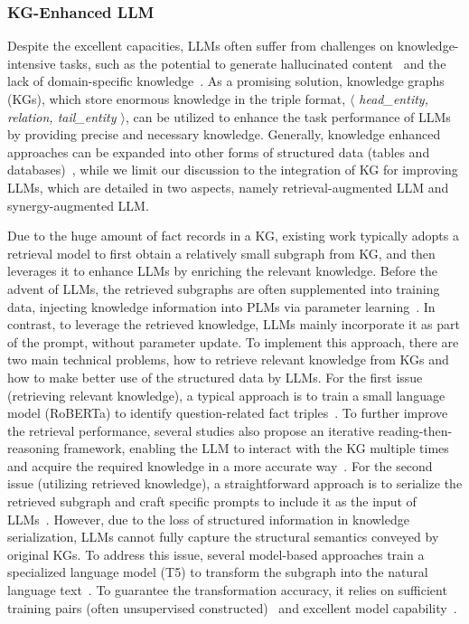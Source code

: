 {\subsubsection{KG-Enhanced LLM}
{
Despite the excellent capacities, LLMs often suffer from challenges on knowledge-intensive tasks, such as 
the potential to generate hallucinated content~\cite{Li-arxiv-2023-HaluEval} and the lack of domain-specific knowledge~\cite{Pan-arxiv-2023-Unifying}. 
As a promising solution, knowledge graphs (KGs),  which store enormous knowledge in the triple format, \ie \textit{$\langle$ head\_entity, relation, tail\_entity $\rangle$}, can be utilized to enhance the task performance of LLMs by providing precise and necessary knowledge.
Generally, knowledge enhanced approaches can be expanded into other forms of structured data (\eg tables and databases)~\cite{Ruiz-arxiv-2023-SemTab}, while we limit our discussion to the integration of KG for improving LLMs, which are detailed in two aspects, namely retrieval-augmented LLM and synergy-augmented LLM. 
}

{
Due to the huge amount of fact records in a KG, existing work typically adopts a retrieval model to first obtain a relatively small subgraph from KG, and then leverages it to enhance LLMs by enriching the relevant knowledge.
Before the advent of LLMs, the retrieved subgraphs are often supplemented into training data,  injecting knowledge information into PLMs via parameter learning~\cite{ERNIE3, Zhang-ACL-19-ERNIE, Wang-TACL-21-KEPLER}. 
In contrast, to leverage the retrieved knowledge, LLMs mainly incorporate it as part of the prompt, without  parameter update.  
To implement this approach, there are two main technical problems,  \ie how to retrieve relevant knowledge from KGs and how to make better use of  the structured data by LLMs.  
For the first issue (\ie retrieving relevant knowledge), 
a typical approach is to train a small language model (\eg RoBERTa) to identify question-related fact triples~\cite{Zhang-ACL-2022-Subgraph}. 
To further improve the retrieval performance, several studies also propose an iterative reading-then-reasoning framework, enabling the LLM to interact with the KG multiple times and acquire the required knowledge in a more accurate way~\cite{Jiang-2023-arxiv-StructGPT}.
For the second issue (\ie utilizing retrieved knowledge), a straightforward approach is to serialize the retrieved subgraph and craft specific prompts to include it as the input of LLMs~\cite{Xie-EMNLP-2022-UnifiedSKG, Zhou-ICLR-2023-Large}.
However, due to the loss of structured information in knowledge serialization, LLMs cannot fully capture the structural semantics conveyed by original KGs.  
To address this issue, several model-based approaches train a specialized language model (\eg T5) to transform the subgraph into the natural language text~\cite{Ke-ACL-21-JointGT}.
To guarantee the transformation accuracy, it  relies on sufficient training pairs (often unsupervised constructed)~\cite{Agarwal-arxiv-2020-Large} and excellent model  capability~\cite{Chen-EMNLP-2020-KGPT}.  
}


}
